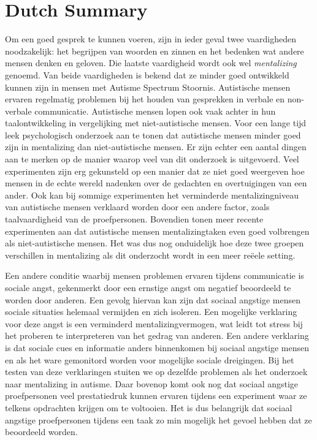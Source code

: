 {}
\section*{Dutch Summary}

Om een goed gesprek te kunnen voeren, zijn in ieder geval twee vaardigheden noodzakelijk: het begrijpen van woorden en zinnen en het bedenken wat andere mensen denken en geloven. Die laatste vaardigheid wordt ook wel \emph{mentalizing} genoemd. Van beide vaardigheden is bekend dat ze minder goed ontwikkeld kunnen zijn in mensen met Autisme Spectrum Stoornis. Autistische mensen ervaren regelmatig problemen bij het houden van gesprekken in verbale en non-verbale communicatie. Autistische mensen lopen ook vaak achter in hun taalontwikkeling in vergelijking met niet-autistische mensen. Voor een lange tijd leek psychologisch onderzoek aan te tonen dat autistische mensen minder goed zijn in mentalizing dan niet-autistische mensen. Er zijn echter een aantal dingen aan te merken op de manier waarop veel van dit onderzoek is uitgevoerd. Veel experimenten zijn erg gekunsteld op een manier dat ze niet goed weergeven hoe mensen in de echte wereld nadenken over de gedachten en overtuigingen van een ander. Ook kan bij sommige experimenten het verminderde mentalizingniveau van autistische mensen verklaard worden door een andere factor, zoals taalvaardigheid van de proefpersonen. Bovendien tonen meer recente experimenten aan dat autistische mensen mentalizingtaken even goed volbrengen als niet-autistische mensen. Het was dus nog onduidelijk hoe deze twee groepen verschillen in mentalizing als dit onderzocht wordt in een meer re\"eele setting.

Een andere conditie waarbij mensen problemen ervaren tijdens communicatie is sociale angst, gekenmerkt door een ernstige angst om negatief beoordeeld te worden door anderen. Een gevolg hiervan kan zijn dat sociaal angstige mensen sociale situaties helemaal vermijden en zich isoleren. Een mogelijke verklaring voor deze angst is een verminderd mentalizingvermogen, wat leidt tot stress bij het proberen te interpreteren van het gedrag van anderen. Een andere verklaring is dat sociale cues en informatie anders binnenkomen bij sociaal angstige mensen en als het ware gemonitord worden voor mogelijke sociale dreigingen. Bij het testen van deze verklaringen stuiten we op dezelfde problemen als het onderzoek naar mentalizing in autisme. Daar bovenop komt ook nog dat sociaal angstige proefpersonen veel prestatiedruk kunnen ervaren tijdens een experiment waar ze telkens opdrachten krijgen om te voltooien. Het is dus belangrijk dat sociaal angstige proefpersonen tijdens een taak zo min mogelijk het gevoel hebben dat ze beoordeeld worden.


